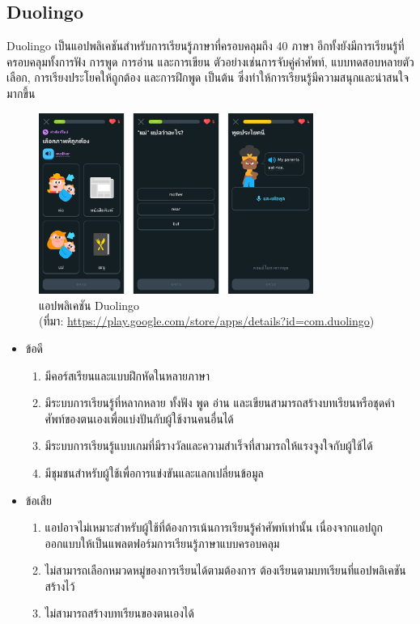 \documentclass[12pt,oneside,openright,a4paper]{cpe-thai-project}
\begin{document}
\pagebreak
\subsection{Duolingo}

\hspace{1cm}
Duolingo \cite{Duolingo} เป็นแอปพลิเคชันสำหรับการเรียนรู้ภาษาที่ครอบคลุมถึง 40 ภาษา อีกทั้งยังมีการเรียนรู้ที่ครอบคลุมทั้งการฟัง การพูด การอ่าน และการเขียน
ตัวอย่างเช่นการจับคู่คำศัพท์, แบบทดสอบหลายตัวเลือก, การเรียงประโยคให้ถูกต้อง และการฝึกพูด เป็นต้น ซึ่งทำให้การเรียนรู้มีความสนุกและน่าสนใจมากขึ้น

\begin{figure}[!h]\centering
	\includegraphics[width=0.8\textwidth, keepaspectratio=true]{image/chap2/duolingoEX.png}
	\caption[แอปพลิเคชัน Duolingo]{แอปพลิเคชัน Duolingo \\ (ที่มา: \href {https://play.google.com/store/apps/details?id=com.duolingo} {https://play.google.com/store/apps/details?id=com.duolingo})\centering}\label{fig:duolingoEX}
\end{figure}

\begin{itemize}
	\item ข้อดี
	      \begin{enumerate}
		      \item มีคอร์สเรียนและแบบฝึกหัดในหลายภาษา
		      \item มีระบบการเรียนรู้ที่หลากหลาย ทั้งฟัง พูด อ่าน และเขียนสามารถสร้างบทเรียนหรือชุดคำศัพท์ของตนเองเพื่อแบ่งปันกับผู้ใช้งานคนอื่นได้
		      \item มีระบบการเรียนรู้แบบเกมที่มีรางวัลและความสำเร็จที่สามารถให้แรงจูงใจกับผู้ใช้ได้
		      \item มีชุมชนสำหรับผู้ใช้เพื่อการแข่งขันและแลกเปลี่ยนข้อมูล
	      \end{enumerate}
	\item ข้อเสีย
	      \begin{enumerate}
		      \item แอปอาจไม่เหมาะสำหรับผู้ใช้ที่ต้องการเน้นการเรียนรู้คำศัพท์เท่านั้น เนื่องจากแอปถูกออกแบบให้เป็นแพลตฟอร์มการเรียนรู้ภาษาแบบครอบคลุม
		      \item ไม่สามารถเลือกหมวดหมู่ของการเรียนได้ตามต้องการ ต้องเรียนตามบทเรียนที่แอปพลิเคชันสร้างไว้
		      \item ไม่สามารถสร้างบทเรียนของตนเองได้
	      \end{enumerate}
\end{itemize}
\end{document}
